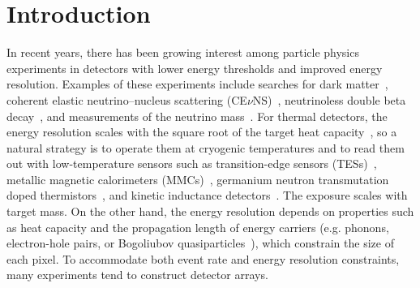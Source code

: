 \documentclass[
 prd,
 reprint,
 superscriptaddress,
 amsmath,amssymb,
 aps,
 floatfix,
]{revtex4-2}
\newcommand{\cevns}{CE$\nu$NS\xspace}
\begin{document}
\maketitle

\section{Introduction}

In recent years, there has been growing interest among particle physics experiments in detectors with lower energy thresholds and improved energy resolution. Examples of these experiments include searches for dark matter~\cite{armengaud_constraints_2016, agnese_first_2018, angloher_results_2023, alloni_new_2025}, coherent elastic neutrino--nucleus scattering (\cevns)~\cite{angloher_exploring_2019, augier_ricochet_2023}, neutrinoless double beta decay~\cite{legend_design_2021, the_cuore_collaboration_search_2022, agrawal_development_2025, cupidcollaboration_cupid_2025}, and measurements of the neutrino mass~\cite{gastaldo_electron_2014, faverzani_holmes_2016}. For thermal detectors, the energy resolution scales with the square root of the target heat capacity~\cite{ascheron_thermal_2005}, so a natural strategy is to operate them at cryogenic temperatures and to read them out with low-temperature sensors such as transition-edge sensors (TESs)~\cite{irwin_application_1995, ascheron_transition-edge_2005}, metallic magnetic calorimeters (MMCs)~\cite{enss_metallic_2000, kempf_physics_2018}, germanium neutron transmutation doped thermistors~\cite{haller_advanced_1994}, and kinetic inductance detectors~\cite{day_broadband_2003, zmuidzinas_superconducting_2012}. The exposure scales with target mass. On the other hand, the energy resolution depends on properties such as heat capacity and the propagation length of energy carriers (e.g. phonons, electron-hole pairs, or Bogoliubov quasiparticles~\cite{catelani_using_2022}), which constrain the size of each pixel. To accommodate both event rate and energy resolution constraints, many experiments tend to construct detector arrays.
\end{document}
